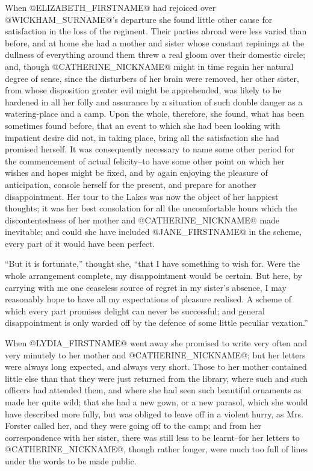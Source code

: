 When @ELIZABETH_FIRSTNAME@ had rejoiced over @WICKHAM_SURNAME@'s departure she found little
other cause for satisfaction in the loss of the regiment. Their parties
abroad were less varied than before, and at home she had a mother and
sister whose constant repinings at the dullness of everything around
them threw a real gloom over their domestic circle; and, though @CATHERINE_NICKNAME@
might in time regain her natural degree of sense, since the disturbers
of her brain were removed, her other sister, from whose disposition
greater evil might be apprehended, was likely to be hardened in all
her folly and assurance by a situation of such double danger as a
watering-place and a camp. Upon the whole, therefore, she found, what
has been sometimes found before, that an event to which she had been
looking with impatient desire did not, in taking place, bring all the
satisfaction she had promised herself. It was consequently necessary to
name some other period for the commencement of actual felicity--to have
some other point on which her wishes and hopes might be fixed, and by
again enjoying the pleasure of anticipation, console herself for the
present, and prepare for another disappointment. Her tour to the Lakes
was now the object of her happiest thoughts; it was her best consolation
for all the uncomfortable hours which the discontentedness of her mother
and @CATHERINE_NICKNAME@ made inevitable; and could she have included @JANE_FIRSTNAME@ in the
scheme, every part of it would have been perfect.

``But it is fortunate,'' thought she, ``that I have something to wish for.
Were the whole arrangement complete, my disappointment would be certain.
But here, by carrying with me one ceaseless source of regret in my
sister's absence, I may reasonably hope to have all my expectations of
pleasure realised. A scheme of which every part promises delight can
never be successful; and general disappointment is only warded off by
the defence of some little peculiar vexation.''

When @LYDIA_FIRSTNAME@ went away she promised to write very often and very minutely
to her mother and @CATHERINE_NICKNAME@; but her letters were always long expected, and
always very short. Those to her mother contained little else than that
they were just returned from the library, where such and such officers
had attended them, and where she had seen such beautiful ornaments as
made her quite wild; that she had a new gown, or a new parasol, which
she would have described more fully, but was obliged to leave off in a
violent hurry, as Mrs. Forster called her, and they were going off to
the camp; and from her correspondence with her sister, there was still
less to be learnt--for her letters to @CATHERINE_NICKNAME@, though rather longer, were
much too full of lines under the words to be made public.


